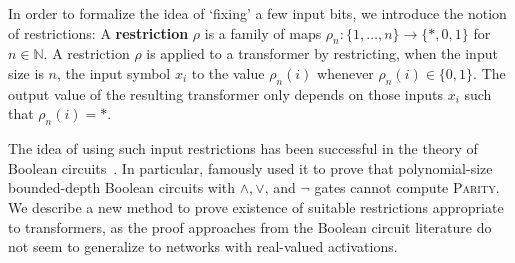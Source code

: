 \documentclass[11pt,a4paper]{article}
\newcommand{\key}[1]{\textbf{#1}}
\begin{document}
In order to formalize the idea of `fixing'  a few input bits, we introduce the notion of restrictions:
A \key{restriction} $\rho$ is a family of maps $\rho_n : \{1, \dots, n\} \rightarrow \{*, 0, 1\}$ for $n \in \mathbb{N}$.
A restriction $\rho$ is applied to a transformer by restricting, when the input size is $n$, the input symbol $x_i$ to the value $\rho_n(i)$ whenever $\rho_n(i) \in \{0, 1\}$.
The output value of the resulting transformer only depends on those inputs $x_i$ such that $\rho_n(i) = *$.


The idea of using such input restrictions has been successful in the theory of Boolean circuits~\cite{furst1984parity,yao1986separating,hastad1994optimal}.
In particular, \citet{furst1984parity}  famously used it to prove that polynomial-size bounded-depth Boolean circuits with $\wedge, \vee$, and $\neg$ gates cannot compute \textsc{Parity}.
We describe a new method to prove existence of suitable restrictions appropriate to transformers, as the proof approaches from the Boolean circuit literature do not seem to generalize to networks with real-valued activations.
\end{document}

